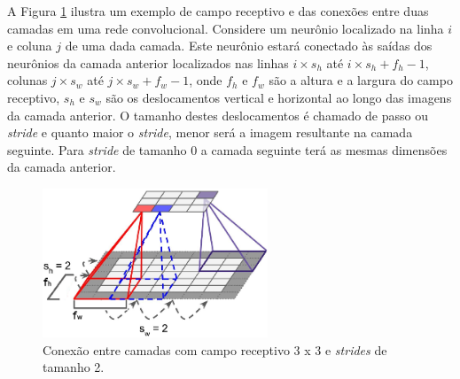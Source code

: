 A Figura \ref{fig:cnn_stride} ilustra  um exemplo de campo receptivo e das conexões entre duas camadas em uma rede convolucional.
Considere um neurônio localizado na linha $i$ e coluna $j$ de uma dada camada.
Este neurônio estará conectado às saídas dos neurônios da camada anterior
localizados nas linhas ${i}\times{s_h}$ até ${i}\times{s_h}+f_h - 1$, colunas
${j}\times{s_w}$ até ${j}\times{s_w}+f_w - 1$, onde
$f_h$ e $f_w$ são a altura e a largura do campo receptivo, $s_h$ e $s_w$
são os deslocamentos vertical e horizontal ao longo das imagens da camada anterior.
O tamanho destes deslocamentos é chamado de passo ou \textit{stride}
e quanto maior o \textit{stride}, menor será a imagem resultante na camada seguinte. Para \textit{stride}
de tamanho $0$ a camada seguinte terá as mesmas dimensões da camada anterior.
\begin{figure}[htp]
\begin{center}
  \includegraphics[width=0.6\textwidth]{fig/cnn_layer_stride_2}
  \caption{Conexão entre camadas com campo receptivo 3 x 3 e \textit{strides} de tamanho 2. \citep{aurelien17}}
  \label{fig:cnn_stride}
\end{center}
\end{figure}

